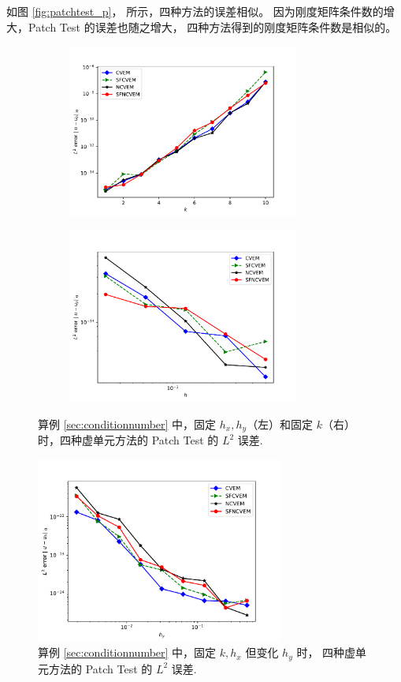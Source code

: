 如图 \ref{fig:patchtest_p}， 
所示，四种方法的误差相似。
因为刚度矩阵条件数的增大，Patch Test 的误差也随之增大，
四种方法得到的刚度矩阵条件数是相似的。
\begin{figure}[htp]
\centering
\begin{subfigure}[t]{0.45\linewidth}
\centering
\includegraphics[width=3.0in]{./figures/stabfree/patch_test_p.pdf}
\end{subfigure}%
\begin{subfigure}[t]{0.45\linewidth}
\centering
\includegraphics[width=3.0in]{./figures/stabfree/patch_test_h.pdf}
\end{subfigure}
\caption{算例 \ref{sec:conditionnumber} 中，固定 $h_x, h_y$（左）和固定
$k$（右）时，四种虚单元方法的 Patch Test 的 $L^2$ 误差.}
\label{fig:patchtest_ph}
\end{figure}


\begin{figure}[htp]
\centering
\includegraphics[width=3.2in]{./figures/stabfree/patch_test_hy.pdf}
\caption{算例 \ref{sec:conditionnumber} 中，固定 $k, h_x$ 但变化 $h_y$ 时，
四种虚单元方法的 Patch Test 的 $L^2$ 误差.}
\label{fig:patchtest_hy}
\end{figure}


